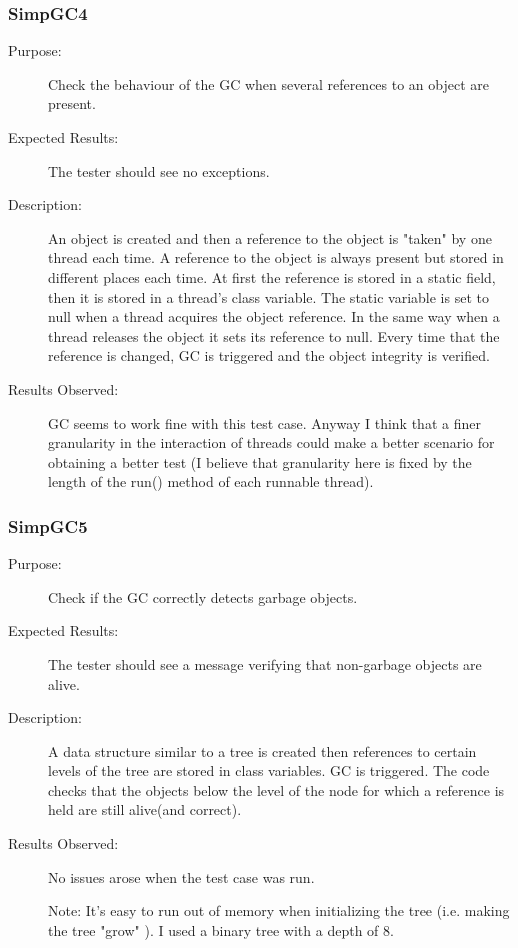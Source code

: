 \subsubsection{SimpGC4}

\begin{description}
    \item[Purpose:]
Check the behaviour of the GC when several references to an object
are present.
    \item[Expected Results:]
The tester should see no exceptions.
    \item[Description:]
An object is created and then a reference to the object is "taken"
by one thread each time. A reference to the object is always present
but stored in different places each time. At first the reference is
stored in a static field, then it is stored in a thread's class
variable. The static variable is set to null when a thread acquires
the object reference. In the same way when a thread releases the
object it sets its reference to null. Every time that the reference
is changed, GC is triggered and the object integrity is verified.
    \item[Results Observed:]
GC seems to work fine with this test case. Anyway I think that a
finer granularity in the interaction of threads could make a better
scenario for obtaining a better test (I believe that granularity
here is fixed by the length of the run() method of each runnable
thread).
\end{description}

\subsubsection{SimpGC5}

\begin{description}
    \item[Purpose:]
Check if the GC correctly detects garbage objects.
    \item[Expected Results:]
The tester should see a message verifying that non-garbage objects
are alive.
    \item[Description:]
A data structure similar to a tree is created then references to
certain levels of the tree are stored in class variables. GC is
triggered. The code checks that the objects below the level of the
node for which a reference is held are still alive(and correct).
    \item[Results Observed:]
No issues arose when the test case was run.

Note: It's easy to run out of memory when initializing the tree
(i.e. making the tree "grow" ). I used a binary tree with a depth of
8.

\end{description}

